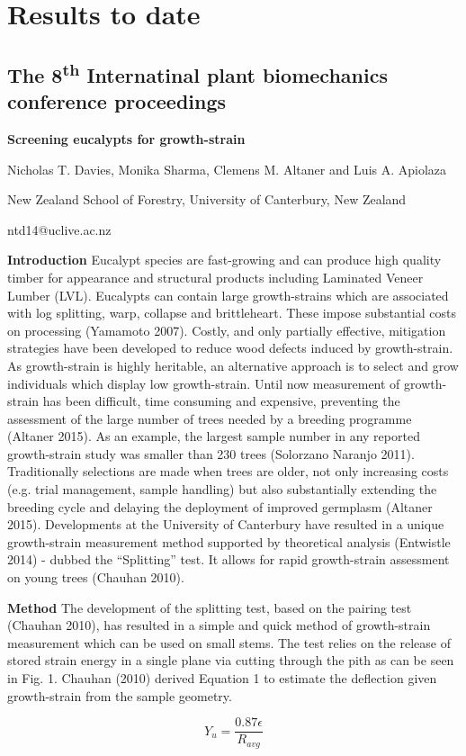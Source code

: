 \section{Results to date}
\subsection{ The 8\textsuperscript{th} Internatinal plant biomechanics conference proceedings}
\begin{center}
\textbf{Screening eucalypts for growth-strain}

Nicholas T. Davies, Monika Sharma, Clemens M. Altaner and Luis A. Apiolaza

New Zealand School of Forestry, University of Canterbury, New Zealand

ntd14@uclive.ac.nz  
\end{center}

\textbf{Introduction}
Eucalypt species are fast-growing and can produce high quality timber for appearance and structural products including Laminated Veneer Lumber (LVL). Eucalypts can contain large growth-strains which are associated with log splitting, warp, collapse and brittleheart. These impose substantial costs on processing (Yamamoto 2007). Costly, and only partially effective, mitigation strategies have been developed to reduce wood defects induced by growth-strain. As growth-strain is highly heritable, an alternative approach is to select and grow individuals which display low growth-strain. Until now measurement of growth-strain has been difficult, time consuming and expensive, preventing the assessment of the large number of trees needed by a breeding programme (Altaner 2015). As an example, the largest sample number in any reported growth-strain study was smaller than 230 trees (Solorzano Naranjo 2011). Traditionally selections are made when trees are older, not only increasing costs (e.g. trial management, sample handling) but also substantially extending the breeding cycle and delaying the deployment of improved germplasm (Altaner 2015). Developments at the University of Canterbury have resulted in a unique growth-strain measurement method supported by theoretical analysis (Entwistle 2014) - dubbed the “Splitting” test. It allows for rapid growth-strain assessment on young trees (Chauhan 2010).

\textbf{Method}
The development of the splitting test, based on the pairing test (Chauhan 2010), has resulted in a simple and quick method of growth-strain measurement which can be used on small stems. The test relies on the release of stored strain energy in a single plane via cutting through the pith as can be seen in Fig. 1. Chauhan (2010) derived Equation 1 to estimate the deflection given growth-strain from the sample geometry.

\begin{equation}
Y_u = \frac{0.87 \epsilon}{R_{avg}}
\end{equation}
  